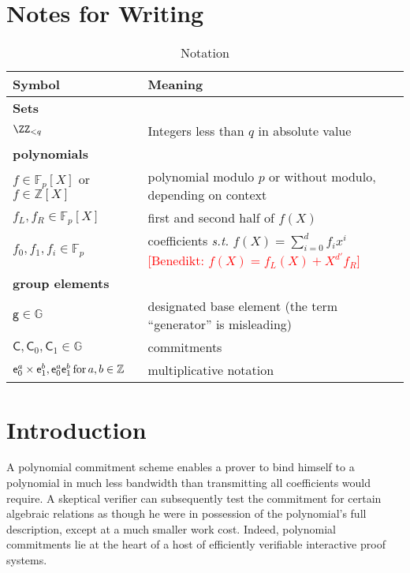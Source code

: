 \documentclass{article}
\theoremstyle{definition}
\newcommand{\benedikt}[1]{{\textcolor{red}{[Benedikt: #1]}}}
\newcommand{\benedikt}[1]{}
\begin{document}
\section*{Notes for Writing}
\begin{table}
    \caption{Notation}
    \label{tab:notation}
    \centering
    \begin{tabular}{l|l}
        Symbol & Meaning   \\ \hline \hline
        {\bf Sets} & \\ \hline
        $\ZZ_{< q}$ & Integers less than $q$ in absolute value\\
        \hline
        {\bf polynomials} & \\ \hline
        $f \in \mathbb{F}_p[X]$ or $f \in \mathbb{Z}[X]$ & polynomial modulo $p$ or without modulo, depending on context \\
        $f_L, f_R \in \mathbb{F}_p[X]$ & first and second half of $f(X)$ \\
        $f_0, f_1, f_i \in \mathbb{F}_p$ & coefficients \emph{s.t.} $f(X) = \sum_{i=0}^d f_ix^i$ \benedikt{$f(X)=f_L(X)+X^{d'} f_R$} \\ \hline
        {\bf group elements} &  \\ \hline
        $\mathsf{g} \in \mathbb{G}$ & designated base element (the term ``generator'' is misleading) \\ 
        $\mathsf{C}, \mathsf{C}_0, \mathsf{C}_1 \in \mathbb{G}$ & commitments \\
        $\mathsf{e}_0^a \times \mathsf{e}_1^b, \mathsf{e}_0^a\mathsf{e}_1^b \, \textnormal{for} \, a, b \in \mathbb{Z}$ & multiplicative notation \\ 
    \end{tabular}
\end{table}

\section{Introduction}

A polynomial commitment scheme enables a prover to bind himself to a polynomial in much less bandwidth than transmitting all coefficients would require. A skeptical verifier can subsequently test the commitment for certain algebraic relations as though he were in possession of the polynomial's full description, except at a much smaller work cost. Indeed, polynomial commitments lie at the heart of a host of efficiently verifiable interactive proof systems.
\end{document}
